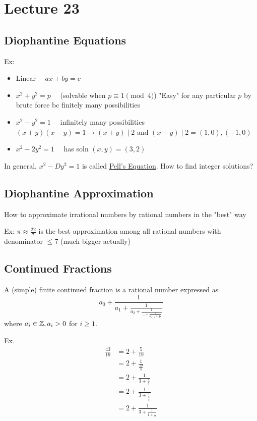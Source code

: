 \chapter{Lecture 23}
\date{November 19, 2024}

\section{Diophantine Equations}
    Ex:
    \begin{itemize}
        \item Linear $\quad ax+by = c$
        \item $x^2 + y^2 = p\quad$ (solvable when $p\equiv 1\pmod{4}$)
                "Easy" for any particular $p$ by brute force bc finitely many possibilities
        \item $x^2-y^2 = 1\quad$ infinitely many possibilities $(x+y)(x-y) = 1 \longrightarrow (x+y)\mid 2$ and $(x-y)\mid 2 = (1,0),(-1,0)$
        \item $x^2-2y^2 = 1\quad$ has soln $(x,y)=(3,2)$
    \end{itemize}

    In general, $x^2 - Dy^2 = 1$ is called \underline{Pell's Equation}. 
    How to find integer solutions?

\section{Diophantine Approximation}
    How to approximate irrational numbers by rational numbers in the "best" way

    Ex: $\pi\approx\frac{22}{7}$ is the best approximation among all rational 
    numbers with denominator $\le 7$ (much bigger actually)

\section{Continued Fractions}
    \begin{definition}
        A (simple) finite continued fraction is a rational number expressed as 
        \[
            a_0 + \frac{1}{a_1 + \frac{1}{a_2 + \frac{1}{\dots+\frac{1}{a_{n-1} + \frac{1}{a_n}}}}}
        \]
        where $a_i\in\mathbb{Z}, a_i > 0$ for $i\ge 1$.
    \end{definition}
    Ex. 
    \begin{align*}
        \frac{43}{19} &= 2 + \frac{5}{19} \\
        &= 2 + \frac{1}{\frac{19}{5}} \\ 
        &= 2 + \frac{1}{3 + \frac{4}{5}} \\
        &= 2 + \frac{1}{3 + \frac{1}{\frac{5}{4}}} \\
        &= 2 + \frac{1}{3 + \frac{1}{1 + \frac{1}{4}}}
    \end{align*}

